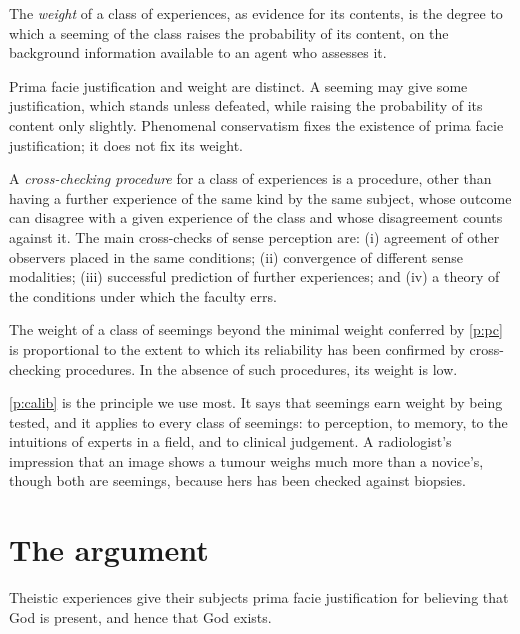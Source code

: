 \documentclass{situationist-preprint}
\begin{document}
\begin{definition}[Weight]\label{d:weight}
The \emph{weight} of a class of experiences, as evidence for its contents, is the degree to which a seeming of the class raises the probability of its content, on the background information available to an agent who assesses it.
\end{definition}

Prima facie justification and weight are distinct. A seeming may give some justification, which stands unless defeated, while raising the probability of its content only slightly. Phenomenal conservatism fixes the existence of prima facie justification; it does not fix its weight.

\begin{definition}\label{d:check}
A \emph{cross-checking procedure} for a class of experiences is a procedure, other than having a further experience of the same kind by the same subject, whose outcome can disagree with a given experience of the class and whose disagreement counts against it. The main cross-checks of sense perception are: (i) agreement of other observers placed in the same conditions; (ii) convergence of different sense modalities; (iii) successful prediction of further experiences; and (iv) a theory of the conditions under which the faculty errs.
\end{definition}

\begin{principle}[Calibration]\label{p:calib}
The weight of a class of seemings beyond the minimal weight conferred by \ref{p:pc} is proportional to the extent to which its reliability has been confirmed by cross-checking procedures. In the absence of such procedures, its weight is low.
\end{principle}

\ref{p:calib} is the principle we use most. It says that seemings earn weight by being tested, and it applies to every class of seemings: to perception, to memory, to the intuitions of experts in a field, and to clinical judgement. A radiologist's impression that an image shows a tumour weighs much more than a novice's, though both are seemings, because hers has been checked against biopsies.

\section{The argument}

\begin{proposition}\label{p:prima}
Theistic experiences give their subjects prima facie justification for believing that God is present, and hence that God exists.
\end{proposition}
\end{document}
